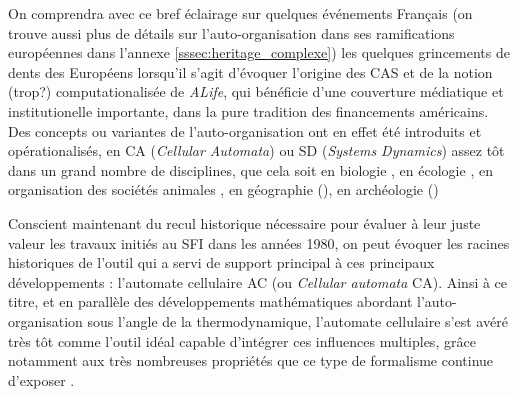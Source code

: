 On comprendra avec ce bref éclairage sur quelques événements Français (on trouve aussi plus de détails sur l'auto-organisation dans ses ramifications européennes dans l'annexe \ref{sssec:heritage_complexe}) les quelques grincements de dents des Européens \autocites{Varela1995} lorsqu'il s'agit d'évoquer l'origine des CAS et de la notion (trop?) computationalisée de \textit{ALife}, qui bénéficie d'une couverture médiatique et institutionelle importante, dans la pure tradition des financements américains. Des concepts ou variantes de l'auto-organisation ont en effet été introduits et opérationalisés, en CA (\textit{Cellular Automata}) ou SD (\textit{Systems Dynamics}) assez tôt dans un grand nombre de disciplines, que cela soit en biologie \autocite{Varela1974, Pattee2001, Hogeweg1978}, en écologie \autocites{Hogeweg1979, Hogeweg1981, Hogeweg1983}, en organisation des sociétés animales \autocites{Prigogine1977, Deneubourg1976, Deneubourg1977}, en géographie (\autocite{Pumain2003}), en archéologie (\autocite{Renfrew1982}) %


Conscient maintenant du recul historique nécessaire pour évaluer à leur juste valeur les travaux initiés au SFI dans les années 1980, on peut évoquer les racines historiques de l'outil qui a servi de support principal à ces principaux développements : l'automate cellulaire AC (ou \textit{Cellular automata} CA). Ainsi à ce titre, et en parallèle des développements mathématiques abordant l'auto-organisation sous l'angle de la thermodynamique, l'automate cellulaire s'est avéré très tôt comme l'outil idéal capable d'intégrer ces influences multiples, grâce notamment aux très nombreuses propriétés que ce type de formalisme continue d'exposer \autocite{Ganguly2003}. %

